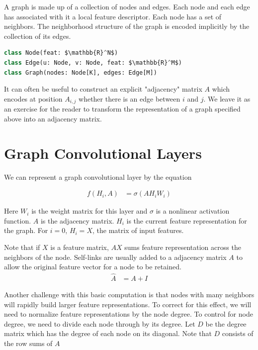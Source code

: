 \documentclass[book.tex]{subfiles}
\begin{document}
A graph is made up of a collection of nodes and edges. Each node and each edge has associated with it a local feature descriptor. Each node has a set of neighbors. The neighborhood structure of the graph is encoded implicitly by the collection of its edges. 

\begin{lstlisting}[language=python]
class Node(feat: $\mathbb{R}^N$)
class Edge(u: Node, v: Node, feat: $\mathbb{R}^M$)
class Graph(nodes: Node[K], edges: Edge[M])
\end{lstlisting}

It can often be useful to construct an explicit "adjacency" matrix $A$ which encodes at position $A_{i,j}$ whether there is an edge between $i$ and $j$. We leave it as an exercise for the reader to transform the representation of a graph specified above into an adjacency matrix.

\section{Graph Convolutional Layers}

We can represent a graph convolutional layer by the equation


\begin{align}
    f(H_i, A) &= \sigma(AH_i W_i)
\end{align}

Here $W_i$ is the weight matrix for this layer and $\sigma$ is a nonlinear activation function. $A$ is the adjacency matrix. $H_i$ is the current feature representation for the graph. For $i=0$, $H_i = X$, the matrix of input features.

Note that if $X$ is a feature matrix, $A X$ sums feature representation across the neighbors of the node. Self-links are usually added to a adjacency matrix $A$ to allow the original feature vector for a node to be retained.
\begin{align}
    \hat{A} &= A + I
\end{align}

Another challenge with this basic computation is that nodes with many neighbors will rapidly build larger feature representations. To correct for this effect, we will need to normalize feature representations by the node degree. To control for node degree, we need to divide each node through by its degree. Let $D$ be the degree matrix which has the degree of each node on its diagonal. Note that $D$ consists of the row sums of $A$ 
\end{document}
